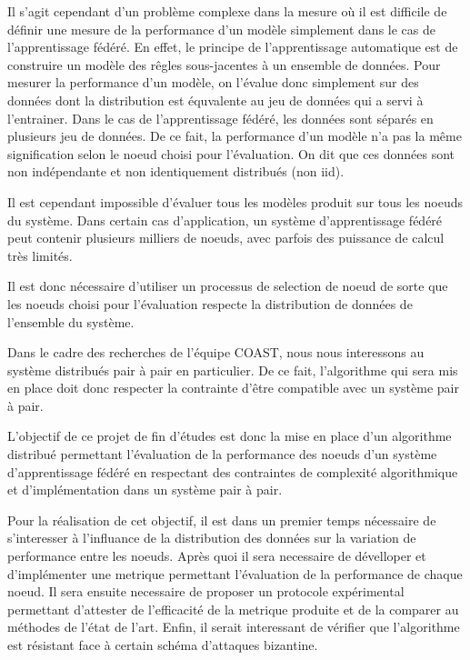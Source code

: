 \documentclass[stage3a]{tnreport} %
\begin{document}
Il s'agit cependant d'un problème complexe dans la mesure où il est difficile de définir une mesure de la performance d'un modèle simplement dans le cas de l'apprentissage fédéré. En effet, le principe de l'apprentissage automatique est de construire un modèle des rêgles sous-jacentes à un ensemble de données. Pour mesurer la performance d'un modèle, on l'évalue donc simplement sur des données dont la distribution est équvalente au jeu de données qui a servi à l'entrainer.  Dans le cas de l'apprentissage fédéré, les données sont séparés en plusieurs jeu de données. De ce fait, la performance d'un modèle n'a pas la même signification selon le noeud choisi pour l'évaluation. On dit que ces données sont non indépendante et non identiquement distribués (non iid).


Il est cependant impossible d'évaluer tous les modèles produit sur tous les noeuds du système. Dans certain cas d'application, un système d'apprentissage fédéré peut contenir plusieurs milliers de noeuds, avec parfois des puissance de calcul très limités. 

Il est donc  nécessaire d'utiliser un processus de selection de noeud de sorte que les noeuds choisi pour l'évaluation respecte la distribution de données de l'ensemble du système. %
 



Dans le cadre des recherches de l'équipe COAST, nous nous interessons au système distribués pair à pair en particulier. De ce fait, l'algorithme qui sera mis en place doit donc respecter la contrainte d'être compatible avec un système pair à pair.

L'objectif de ce projet de fin d'études est donc la mise en place d'un algorithme distribué permettant l'évaluation de la performance des noeuds d'un système d'apprentissage fédéré en respectant des contraintes de complexité algorithmique et d'implémentation dans un système pair à pair.  

Pour la réalisation de cet objectif, il est dans un premier temps nécessaire de s'interesser à l'influance de la distribution des données sur la variation de performance entre les noeuds. Après quoi il sera necessaire de dévelloper et d'implémenter une metrique permettant l'évaluation de la performance de chaque noeud. Il sera ensuite necessaire de proposer un protocole expérimental permettant d'attester de l'efficacité de la metrique produite et de la comparer au méthodes de l'état de l'art. Enfin, il serait interessant de vérifier que l'algorithme est résistant face à certain schéma d'attaques bizantine.
\end{document}
